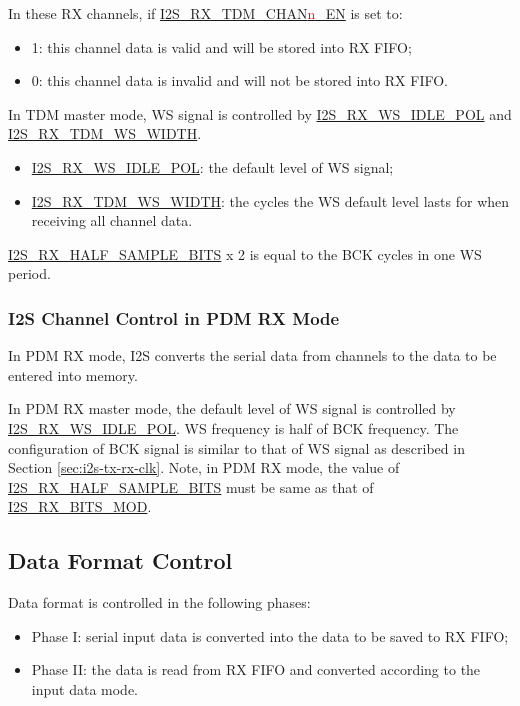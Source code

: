 \documentclass[main\_\_EN.tex]{subfiles}
\begin{document}
In these RX channels, if \hyperref[fielddesc:I2STXTDMCHAN0EN]{I2S\_RX\_TDM\_CHAN{\textcolor{red}{n}}\_EN} is set to:
\begin{itemize}
    \item 1: this channel data is valid and will be stored into RX FIFO;
    \item 0: this channel data is invalid and will not be stored into RX FIFO.
\end{itemize}
In TDM master mode, WS signal is controlled by \hyperref[fielddesc:I2SRXWSIDLEPOL]{I2S\_RX\_WS\_IDLE\_POL} and \hyperref[fielddesc:I2SRXTDMWSWIDTH]{I2S\_RX\_TDM\_WS\_WIDTH}.
\begin{itemize}
    \item \hyperref[fielddesc:I2SRXWSIDLEPOL]{I2S\_RX\_WS\_IDLE\_POL}: the default level of WS signal;
    \item \hyperref[fielddesc:I2SRXTDMWSWIDTH]{I2S\_RX\_TDM\_WS\_WIDTH}: the cycles the WS default level lasts for when receiving all channel data.
\end{itemize}
\hyperref[fielddesc:I2SRXHALFSAMPLEBITS]{I2S\_RX\_HALF\_SAMPLE\_BITS} x 2 is equal to the BCK cycles in one WS period.

\subsubsection{I2S Channel Control in PDM RX Mode} 
In PDM RX mode, I2S converts the serial data from channels to the data to be entered into memory.

In PDM RX master mode, the default level of WS signal is controlled by \hyperref[fielddesc:I2SRXWSIDLEPOL]{I2S\_RX\_WS\_IDLE\_POL}. WS frequency is half of BCK frequency. The configuration of BCK signal is similar to that of WS signal as described in Section \ref{sec:i2s-tx-rx-clk}. Note, in PDM RX mode, the value of \hyperref[fielddesc:I2SRXHALFSAMPLEBITS]{I2S\_RX\_HALF\_SAMPLE\_BITS} must be same as that of \hyperref[fielddesc:I2SRXBITSMOD]{I2S\_RX\_BITS\_MOD}.


\subsection{Data Format Control}
Data format is controlled in the following phases:
\begin{itemize}
    \item Phase I: serial input data is converted into the data to be saved to RX FIFO;
    \item Phase II: the data is read from RX FIFO and converted according to the input data mode.
\end{itemize}
\end{document}
